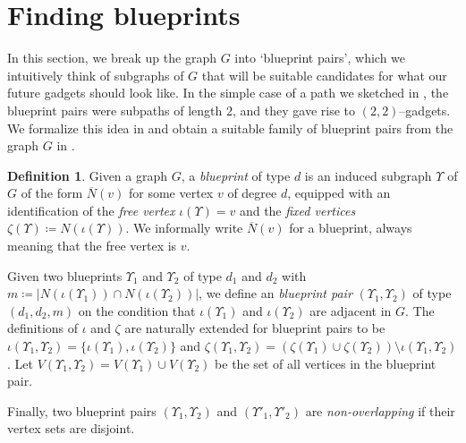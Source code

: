 \documentclass{article}
\theoremstyle{definition}
\newtheorem{defn}[theorem]{Definition}
\begin{document}

\section{Finding blueprints}\label{sec.blueprints}

In this section, we break up the graph $G$ into `blueprint pairs', which we intuitively think of subgraphs of $G$ that will be suitable candidates for what our future gadgets should look like. In the simple case of a path we sketched in , the blueprint pairs were subpaths of length $2$, and they gave rise to $(2, 2)$--gadgets. We formalize this idea in  and obtain a suitable family of blueprint pairs from the graph $G$ in .

\begin{defn} \label{blueprints}
    Given a graph $G$, a \emph{blueprint} of type $d$ is an induced subgraph $\Upsilon$ of $G$ of the form $\overline{N}(v)$ for some vertex $v$ of degree $d$, equipped with an identification of the \emph{free vertex} $\iota(\Upsilon)=v$ and the \emph{fixed vertices} $\zeta(\Upsilon)\coloneqq N(\iota(\Upsilon))$. We informally write $\overline{N}(v)$ for a blueprint, always meaning that the free vertex is $v$.
    
    Given two blueprints $\Upsilon_1$ and $\Upsilon_2$ of type $d_1$ and $d_2$ with $m\coloneqq |N(\iota(\Upsilon_1))\cap N(\iota(\Upsilon_2))|$, we define an \emph{blueprint pair} $(\Upsilon_1,\Upsilon_2)$ of type $(d_1,d_2,m)$ on the condition that $\iota(\Upsilon_1)$ and $\iota(\Upsilon_2)$ are adjacent in $G$. The definitions of $\iota$ and $\zeta$ are naturally extended for blueprint pairs to be $\iota(\Upsilon_1,\Upsilon_2) = \{\iota(\Upsilon_1),\iota(\Upsilon_2)\}$ and $\zeta(\Upsilon_1,\Upsilon_2) =(\zeta(\Upsilon_1)\cup \zeta(\Upsilon_2))\setminus \iota(\Upsilon_1,\Upsilon_2)$. Let $V(\Upsilon_1,\Upsilon_2)=V(\Upsilon_1)\cup V(\Upsilon_2)$ be the set of all vertices in the blueprint pair.

    Finally, two blueprint pairs $(\Upsilon_1,\Upsilon_2)$ and $(\Upsilon'_1,\Upsilon'_2)$ are \emph{non-overlapping} if their vertex sets are disjoint.
\end{defn}
\end{document}

